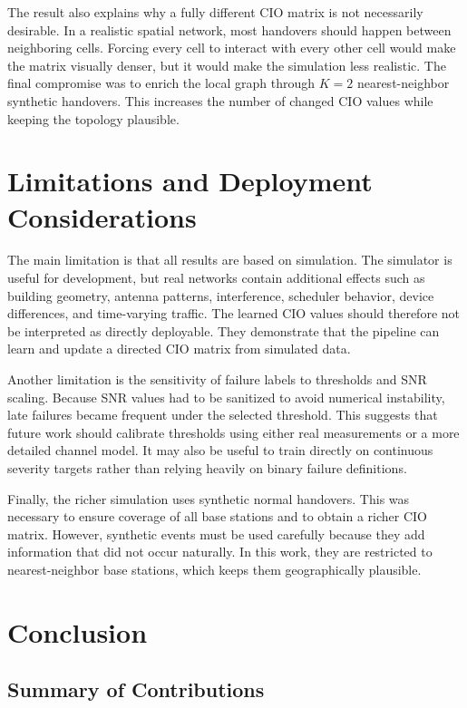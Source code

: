 \documentclass[11pt, a4paper, twoside]{article}
\begin{document}
The result also explains why a fully different CIO matrix is not necessarily desirable. In a realistic spatial network, most handovers should happen between neighboring cells. Forcing every cell to interact with every other cell would make the matrix visually denser, but it would make the simulation less realistic. The final compromise was to enrich the local graph through $K=2$ nearest-neighbor synthetic handovers. This increases the number of changed CIO values while keeping the topology plausible.

\section{Limitations and Deployment Considerations}
\label{sec:limitations}

The main limitation is that all results are based on simulation. The simulator is useful for development, but real networks contain additional effects such as building geometry, antenna patterns, interference, scheduler behavior, device differences, and time-varying traffic. The learned CIO values should therefore not be interpreted as directly deployable. They demonstrate that the pipeline can learn and update a directed CIO matrix from simulated data.

Another limitation is the sensitivity of failure labels to thresholds and SNR scaling. Because SNR values had to be sanitized to avoid numerical instability, late failures became frequent under the selected threshold. This suggests that future work should calibrate thresholds using either real measurements or a more detailed channel model. It may also be useful to train directly on continuous severity targets rather than relying heavily on binary failure definitions.

Finally, the richer simulation uses synthetic normal handovers. This was necessary to ensure coverage of all base stations and to obtain a richer CIO matrix. However, synthetic events must be used carefully because they add information that did not occur naturally. In this work, they are restricted to nearest-neighbor base stations, which keeps them geographically plausible.

\section{Conclusion}
\label{sec:conclusion}

\subsection{Summary of Contributions}
\end{document}
